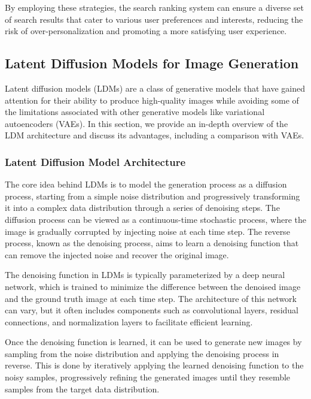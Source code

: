 \documentclass[12pt]{article}
\begin{document}
By employing these strategies, the search ranking system can ensure a diverse set of search results that cater to various user preferences and interests, reducing the risk of over-personalization and promoting a more satisfying user experience.






\subsection{Latent Diffusion Models for Image Generation}

Latent diffusion models (LDMs) are a class of generative models that have gained attention for their ability to produce high-quality images while avoiding some of the limitations associated with other generative models like variational autoencoders (VAEs). In this section, we provide an in-depth overview of the LDM architecture and discuss its advantages, including a comparison with VAEs.

\subsubsection{Latent Diffusion Model Architecture}

The core idea behind LDMs is to model the generation process as a diffusion process, starting from a simple noise distribution and progressively transforming it into a complex data distribution through a series of denoising steps. The diffusion process can be viewed as a continuous-time stochastic process, where the image is gradually corrupted by injecting noise at each time step. The reverse process, known as the denoising process, aims to learn a denoising function that can remove the injected noise and recover the original image.

The denoising function in LDMs is typically parameterized by a deep neural network, which is trained to minimize the difference between the denoised image and the ground truth image at each time step. The architecture of this network can vary, but it often includes components such as convolutional layers, residual connections, and normalization layers to facilitate efficient learning.

Once the denoising function is learned, it can be used to generate new images by sampling from the noise distribution and applying the denoising process in reverse. This is done by iteratively applying the learned denoising function to the noisy samples, progressively refining the generated images until they resemble samples from the target data distribution.
\end{document}
